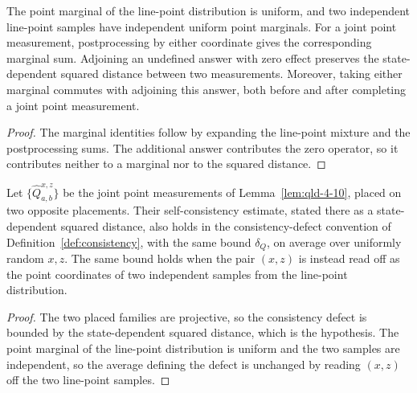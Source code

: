 \begin{lemma}
	\label{lem:qld-line-point-marginal-identities}
	\leanok
	The point marginal of the line-point distribution is uniform, and two
	independent line-point samples have independent uniform point marginals.
	For a joint point measurement, postprocessing by either coordinate gives
	the corresponding marginal sum. Adjoining an undefined answer with zero
	effect preserves the state-dependent squared distance between two
	measurements. Moreover, taking either marginal commutes with adjoining this
	answer, both before and after completing a joint point measurement.
\end{lemma}
\begin{proof}
	\leanok
	The marginal identities follow by expanding the line-point mixture and the
	postprocessing sums. The additional answer contributes the zero operator,
	so it contributes neither to a marginal nor to the squared distance.
\end{proof}

\begin{lemma}
	\label{lem:qld-point-self-consistency-defect}
	\leanok
	Let $\{\hat Q^{x,z}_{a,b}\}$ be the joint point measurements of
	Lemma~\ref{lem:qld-4-10}, placed on two opposite placements. Their
	self-consistency estimate, stated there as a state-dependent squared
	distance, also holds in the consistency-defect convention of
	Definition~\ref{def:consistency}, with the same bound $\delta_Q$, on
	average over uniformly random $x,z$. The same bound holds when the pair
	$(x,z)$ is instead read off as the point coordinates of two independent
	samples from the line-point distribution.
\end{lemma}
\begin{proof}
	\leanok
	The two placed families are projective, so the consistency defect is bounded
	by the state-dependent squared distance, which is the hypothesis. The point
	marginal of the line-point distribution is uniform and the two samples are
	independent, so the average defining the defect is unchanged by reading
	$(x,z)$ off the two line-point samples.
\end{proof}

